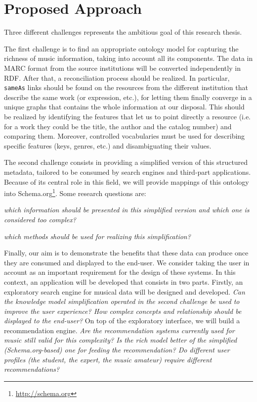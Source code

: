 \documentclass{llncs}
\begin{document}

\section{Proposed Approach}
\label{sec:approach}
Three different challenges represents the ambitious goal of this research thesis.

The first challenge is to find an appropriate ontology model for capturing the richness of music information, taking into account all its components. The data in MARC format from the source institutions will be converted independently in RDF. After that, a reconciliation process should be realized. In particular, \texttt{sameAs} links should be found on the resources from the different institution that describe the same work (or expression, etc.), for letting them finally converge in a unique graphs that contains the whole information at our disposal. This should be realized by identifying the features that let us to point directly a resource (i.e. for a work they could be the title, the author and the catalog number) and comparing them. Moreover, controlled vocabularies must be used for describing specific features (keys, genres, etc.) and disambiguating their values.

The second challenge consists in providing a simplified version of this structured metadata, tailored to be consumed by search engines and third-part applications. Because of its central role in this field, we will provide mappings of this ontology into Schema.org\footnote{\url{http://schema.org}}. Some research questions are:
\begin{enumerate*}
\item{\textit{which information should be presented in this simplified version and which one is considered too complex?}}
\item{\textit{which methods should be used for realizing this simplification?}}
\end{enumerate*}

Finally, our aim is to demonstrate the benefits that these data can produce once they are consumed and displayed to the end-user. We consider taking the user in account as an important requirement for the design of these systems. In this context, an application will be developed that consists in two parts. Firstly, an exploratory search engine for musical data will be designed and developed. \textit{Can the knowledge model simplification operated in the second challenge be used to improve the user experience? How complex concepts and relationship should be displayed to the end-user?} On top of the exploratory interface, we will build a recommendation engine. \textit{Are the recommendation systems currently used for music still valid for this complexity? Is the rich model better of the simplified (Schema.org-based) one for feeding the recommendation? Do different user profiles (the student, the expert, the music amateur) require different recommendations?}
\end{document}
